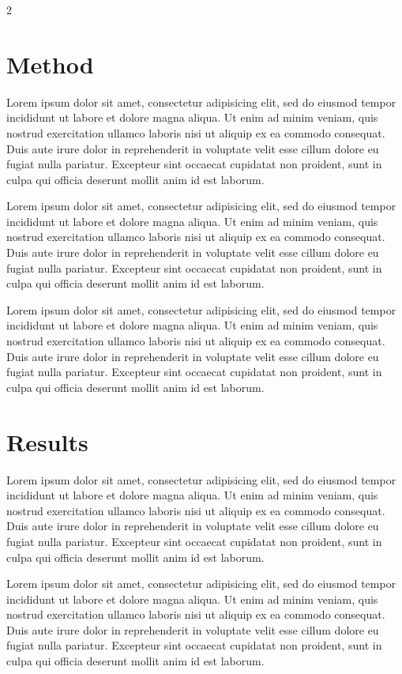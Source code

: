 \documentclass[kulak]{kulakposter}
\begin{document}
\begin{multicols}{2}
	\section*{Method}
	Lorem ipsum dolor sit amet, consectetur adipisicing elit, sed do eiusmod tempor incididunt ut labore et dolore magna aliqua. Ut enim ad minim veniam, quis nostrud exercitation ullamco laboris nisi ut aliquip ex ea commodo consequat. Duis aute irure dolor in reprehenderit in voluptate velit esse cillum dolore eu fugiat nulla pariatur. Excepteur sint occaecat cupidatat non proident, sunt in culpa qui officia deserunt mollit anim id est laborum.
	
	Lorem ipsum dolor sit amet, consectetur adipisicing elit, sed do eiusmod tempor incididunt ut labore et dolore magna aliqua. Ut enim ad minim veniam, quis nostrud exercitation ullamco laboris nisi ut aliquip ex ea commodo consequat. Duis aute irure dolor in reprehenderit in voluptate velit esse cillum dolore eu fugiat nulla pariatur. Excepteur sint occaecat cupidatat non proident, sunt in culpa qui officia deserunt mollit anim id est laborum.
	
	Lorem ipsum dolor sit amet, consectetur adipisicing elit, sed do eiusmod tempor incididunt ut labore et dolore magna aliqua. Ut enim ad minim veniam, quis nostrud exercitation ullamco laboris nisi ut aliquip ex ea commodo consequat. Duis aute irure dolor in reprehenderit in voluptate velit esse cillum dolore eu fugiat nulla pariatur. Excepteur sint occaecat cupidatat non proident, sunt in culpa qui officia deserunt mollit anim id est laborum.
	
	\columnbreak
	\section*{Results}
	Lorem ipsum dolor sit amet, consectetur adipisicing elit, sed do eiusmod tempor incididunt ut labore et dolore magna aliqua. Ut enim ad minim veniam, quis nostrud exercitation ullamco laboris nisi ut aliquip ex ea commodo consequat. Duis aute irure dolor in reprehenderit in voluptate velit esse cillum dolore eu fugiat nulla pariatur. Excepteur sint occaecat cupidatat non proident, sunt in culpa qui officia deserunt mollit anim id est laborum.
	
	Lorem ipsum dolor sit amet, consectetur adipisicing elit, sed do eiusmod tempor incididunt ut labore et dolore magna aliqua. Ut enim ad minim veniam, quis nostrud exercitation ullamco laboris nisi ut aliquip ex ea commodo consequat. Duis aute irure dolor in reprehenderit in voluptate velit esse cillum dolore eu fugiat nulla pariatur. Excepteur sint occaecat cupidatat non proident, sunt in culpa qui officia deserunt mollit anim id est laborum.
\end{multicols}
\end{document}
